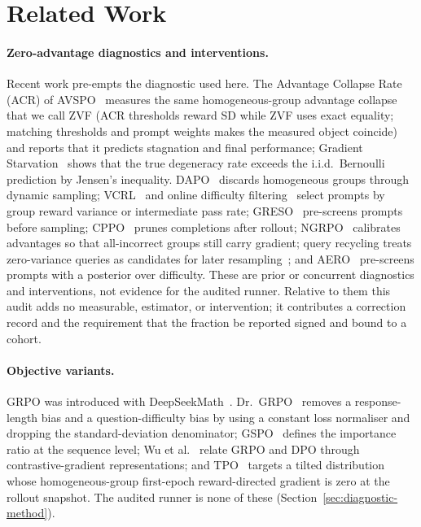 \section{Related Work}
\label{sec:related}

\paragraph{Zero-advantage diagnostics and interventions.}
Recent work pre-empts the diagnostic used here. The Advantage Collapse Rate
(ACR) of AVSPO~\cite{he2026advantage} measures the same homogeneous-group
advantage collapse that we call ZVF (ACR thresholds reward SD while ZVF uses
exact equality; matching thresholds and prompt weights makes the measured
object coincide) and reports that it predicts stagnation and final performance;
Gradient Starvation~\cite{nie2026gradstarvation} shows that the true degeneracy
rate exceeds the i.i.d.\ Bernoulli prediction by Jensen's inequality.
DAPO~\cite{yu2025dapo} discards homogeneous groups through dynamic sampling;
VCRL~\cite{jiang2025vcrl} and online difficulty filtering~\cite{bae2025online}
select prompts by group reward variance or intermediate pass rate;
GRESO~\cite{zhang2026greso} pre-screens prompts before sampling;
CPPO~\cite{lin2025cppo} prunes completions after rollout;
NGRPO~\cite{nan2025ngrpo} calibrates advantages so that all-incorrect groups
still carry gradient; query recycling treats zero-variance queries as
candidates for later resampling~\cite{coelho2026recycling}; and
AERO~\cite{zhang2026aero} pre-screens prompts with a posterior over difficulty.
These are prior or concurrent diagnostics and interventions, not evidence for
the audited runner. Relative to them this audit adds no measurable, estimator,
or intervention; it contributes a correction record and the requirement that
the fraction be reported signed and bound to a cohort.

\paragraph{Objective variants.}
GRPO was introduced with DeepSeekMath~\cite{shao2024deepseekmath}.
Dr.~GRPO~\cite{tong2025drgrpo} removes a response-length bias and a
question-difficulty bias by using a constant loss normaliser and dropping the
standard-deviation denominator; GSPO~\cite{qwen2025gspo} defines the importance
ratio at the sequence level; Wu et al.~\cite{wu2025grpodpo} relate GRPO and DPO
through contrastive-gradient representations; and TPO~\cite{kaddour2026tpo}
targets a tilted distribution whose homogeneous-group first-epoch
reward-directed gradient is zero at the rollout snapshot. The audited runner is
none of these (Section~\ref{sec:diagnostic-method}).

